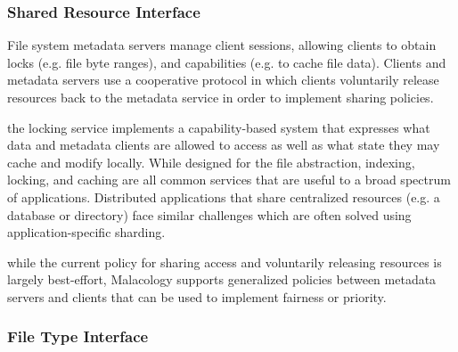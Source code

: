 
\subsubsection{Shared Resource Interface}
\label{sec:shared-resource-interface}

File system metadata servers manage client sessions, allowing
clients to obtain locks (e.g. file byte ranges), and capabilities (e.g. to
cache file data). Clients and metadata servers use a cooperative protocol in
which clients voluntarily release resources back to the  metadata service in order to implement sharing policies.

the locking service implements a capability-based system that expresses what
data and  metadata clients are allowed to access as
well as what state they may cache and modify locally.  While designed for the
file abstraction, indexing, locking, and caching are all common services that
are useful to a broad spectrum of applications.  Distributed applications that
share centralized resources (e.g. a database or directory) face similar
challenges which are often solved using application-specific sharding.

 while the current policy
for sharing access and voluntarily releasing resources is largely best-effort,
Malacology supports generalized policies between metadata servers and clients
that can be used to implement fairness or priority.


\subsubsection{File Type Interface}
\label{sec:file-type-interface}


